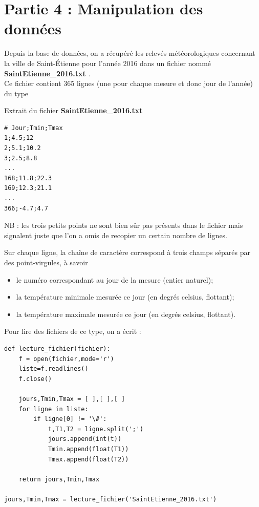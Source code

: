 \documentclass[10pt,fleqn]{article} %
\begin{document}
\section*{Partie 4 : Manipulation des données}

Depuis la base de données, on a récupéré les 
relevés météorologiques  concernant la ville de Saint-Étienne pour l'année 2016 dans
 un fichier nommé \textbf{SaintEtienne\_2016.txt} .\\
  Ce fichier contient 365 lignes (une pour chaque mesure et donc jour de l'année) du 
type 

\begin{exemple}
Extrait du fichier \textbf{SaintEtienne\_2016.txt}
\begin{verbatim}
# Jour;Tmin;Tmax
1;4.5;12
2;5.1;10.2
3;2.5;8.8
...
168;11.8;22.3
169;12.3;21.1
...
366;-4.7;4.7
\end{verbatim}

NB : les trois petits points ne sont bien sûr pas présents dans 
le fichier mais signalent juste que l'on a omis de recopier un certain nombre 
de lignes.
\end{exemple}


Sur chaque ligne, la chaîne de caractère correspond à trois champs séparés par des point-virgules, à savoir
	\begin{itemize}
		\item	le numéro correspondant au jour de la mesure (entier naturel);
		\item	la température minimale mesurée ce jour (en degrés celsius, flottant);
		\item	la température maximale mesurée ce jour (en degrés celsius, flottant).
	\end{itemize}


Pour lire des fichiers de ce type,  on a écrit  :
 \begin{py}
\begin{lstlisting}
def lecture_fichier(fichier):
    f = open(fichier,mode='r')
    liste=f.readlines()
    f.close()
    
    jours,Tmin,Tmax = [ ],[ ],[ ]
    for ligne in liste:
        if ligne[0] != '\#':
            t,T1,T2 = ligne.split(';')
            jours.append(int(t))
            Tmin.append(float(T1))
            Tmax.append(float(T2))
    
    return jours,Tmin,Tmax

jours,Tmin,Tmax = lecture_fichier('SaintEtienne_2016.txt')
\end{lstlisting}
\end{py}
\end{document}
